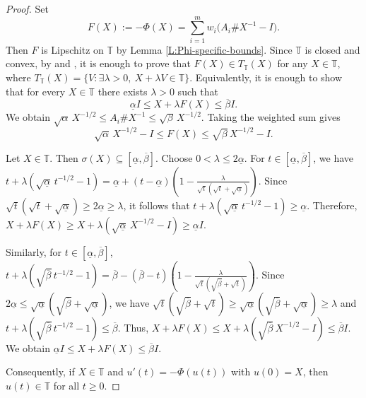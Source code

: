 \documentclass[12pt,reqno]{amsart}
\begin{document}
\begin{proof}
Set
\[
F(X) := -\Phi(X) = \sum_{i=1}^m w_i \bigl( A_i \# X^{-1} - I \bigr).
\]
Then $F$ is Lipschitz on $\mathbb{T}$ by Lemma \ref{L:Phi-specific-bounds}.
Since $\mathbb{T}$ is closed and
convex, by \cite[Remark 2.4]{GQ} and \cite[Proposition 2.5]{GQ},
it is enough to prove that
$F(X) \in T_{\mathbb{T}}(X)$ for any $X \in \mathbb{T}$,
where
$T_{\mathbb{T}}(X) = \{ V: \exists \lambda > 0, \ X + \lambda V \in \mathbb{T} \}$.
Equivalently, it is enough to show that for every $X \in \mathbb{T}$ there exists $\lambda > 0$ such that
\[
\underline{\alpha} I \leq X + \lambda F(X) \leq \overline{\beta} I.
\]
We obtain
$\sqrt{\alpha} \, X^{-1/2} \leq A_i \# X^{-1} \leq \sqrt{\beta} \, X^{-1/2}.$
Taking the weighted sum gives
\begin{equation*}\label{eq:F-order-bound-tangent}
\sqrt{\alpha} \, X^{-1/2} - I \leq F(X) \leq \sqrt{\beta} \, X^{-1/2} - I.
\end{equation*}


Let $X \in \mathbb{T}$. Then $\sigma(X) \subseteq [\underline{\alpha}, \overline{\beta}]$. Choose $0 < \lambda \leq 2\underline{\alpha}$.
For $t \in [\underline{\alpha}, \overline{\beta}]$, we have
$t + \lambda (\sqrt{\underline{\alpha}} \, t^{-1/2} - 1)
= \underline{\alpha} + (t - \underline{\alpha}) \left( 1 - \frac{\lambda}{\sqrt{t}(\sqrt{t}+\sqrt{\underline{\alpha}})} \right)$.
Since
$\sqrt{t}(\sqrt{t}+\sqrt{\underline{\alpha}}) \geq 2\underline{\alpha} \geq \lambda$,
it follows that
$t + \lambda (\sqrt{\underline{\alpha}} \, t^{-1/2} - 1) \geq \underline{\alpha}$.
Therefore,
$X + \lambda F(X) \geq X + \lambda (\sqrt{\underline{\alpha}} \, X^{-1/2} - I) \geq \underline{\alpha} I$.


Similarly, for $t \in [\underline{\alpha},\overline{\beta}]$,
$t + \lambda (\sqrt{\overline{\beta}} \, t^{-1/2} - 1)
= \overline{\beta} - (\overline{\beta}-t) \left(
1 - \frac{\lambda}{\sqrt{t}(\sqrt{\overline{\beta}}+\sqrt{t})}
\right)$.
Since $2 \underline{\alpha} \leq \sqrt{\underline{\alpha}} (\sqrt{\overline{\beta}} + \sqrt{\underline{\alpha}})$, we have
$\sqrt{t}(\sqrt{\overline{\beta}}+\sqrt{t}) \geq
\sqrt{\underline{\alpha}}(\sqrt{\overline{\beta}}+\sqrt{\underline{\alpha}}) \geq \lambda$ and
$t + \lambda (\sqrt{\overline{\beta}} \, t^{-1/2} - 1) \leq \overline{\beta}$.
Thus,
$X + \lambda F(X) \leq X + \lambda (\sqrt{\overline{\beta}} \, X^{-1/2} - I)
\leq \overline{\beta} I$.
We obtain
$\underline{\alpha} I \leq X + \lambda F(X) \leq \overline{\beta} I$.


Consequently, if $X \in \mathbb{T}$ and
$u'(t) = -\Phi(u(t))$ with $u(0) = X$,
then $u(t) \in \mathbb{T}$ for all $t \geq 0$.
\end{proof}
\end{document}
